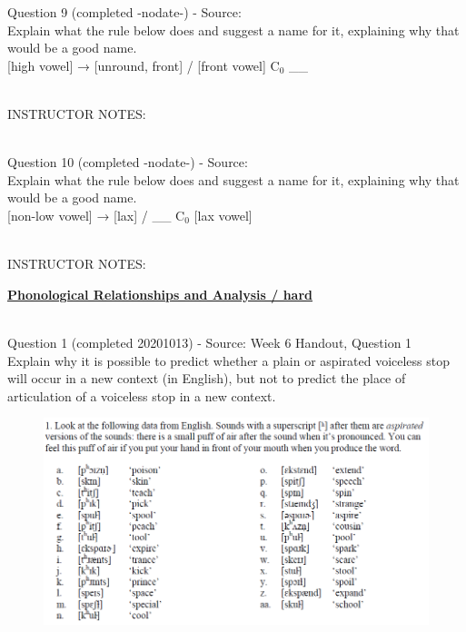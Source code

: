 \documentclass[12pt]{article}
\begin{document}
{\large Question 9} (completed -nodate-) - Source: \\

Explain what the rule below does and suggest a name for it, explaining why that would be a good name.\\

{[high vowel]} →  {[unround, front]} / {[front vowel]} C$_0$ \_\_


~\\
INSTRUCTOR NOTES: 


~\\

{\large Question 10} (completed -nodate-) - Source: \\

Explain what the rule below does and suggest a name for it, explaining why that would be a good name.\\

{[non-low vowel]} →  {[lax]} / \_\_ C$_0$ {[lax vowel]}


~\\
INSTRUCTOR NOTES: 


\newpage\textbf{\underline{\huge Phonological Relationships and Analysis / hard\\}}

~\\

{\large Question 1} (completed 20201013) - Source: Week 6 Handout, Question 1\\

Explain why it is possible to predict whether a plain or aspirated voiceless stop will occur in a new context (in English), but not to predict the place of articulation of a voiceless stop in a new context.\\

\begin{figure}[H]
\includegraphics{../images/aspiration.png}
\end{figure}
\end{document}
